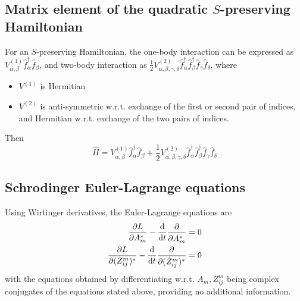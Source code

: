 \documentclass[12pt]{article}
\newcommand{\hc}{^\dagger}
\begin{document}
	\subsection{Matrix element of the quadratic $S$-preserving Hamiltonian}
	For an $S$-preserving Hamiltonian, the one-body interaction can be expressed as $V^{(1)}_{\alpha,\beta}\hat{f}\hc_\alpha\hat{f}_\beta$, and two-body interaction as $\frac{1}{2}V^{(2)}_{\alpha,\beta,\gamma,\delta}\hat{f}\hc_\alpha\hat{f}\hc_\beta\hat{f}_\gamma\hat{f}_\delta$, where
	\begin{itemize}
	\item $V^{(1)}$ is Hermitian
	\item $V^{(2)}$ is anti-symmetric w.r.t. exchange of the first or second pair of indices, and Hermitian w.r.t. exchange of the two pairs of indices.
	\end{itemize}
	Then
	\begin{equation}
	\hat{H}=V^{(1)}_{\alpha,\beta}\hat{f}\hc_\alpha\hat{f}_\beta+\frac{1}{2}V^{(2)}_{\alpha,\beta,\gamma,\delta}\hat{f}\hc_\alpha\hat{f}\hc_\beta\hat{f}_\gamma\hat{f}_\delta
	\end{equation}
	
	\subsection{Schrodinger Euler-Lagrange equations}
	Using Wirtinger derivatives, the Euler-Lagrange equations are
	\begin{align}
	\pdv{L}{A_m^*}-\dv{t}\pdv{\dot{A}_m^*}&=0\\
	\pdv{L}{(Z^m_{ij})^*}-\dv{t}\pdv{(\dot{Z}^m_{ij})^*}&=0
	\end{align}
	with the equations obtained by differentiating w.r.t. $A_m, Z^m_{ij}$ being complex conjugates of the equations stated above, providing no additional information.
	
\end{document}
